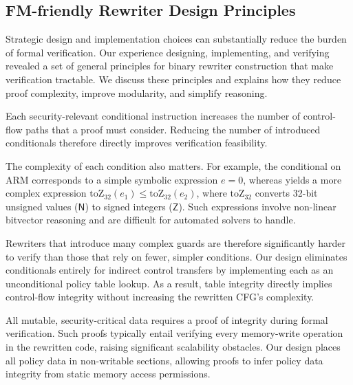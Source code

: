 \subsection{FM-friendly Rewriter Design Principles}\label{sec:fm_friendly}

Strategic design and implementation choices can substantially reduce the burden of formal verification. Our experience designing, implementing, and verifying \pname revealed a set of general principles for binary rewriter construction that make verification tractable. We discuss these principles and explains how they reduce proof complexity, improve modularity, and simplify reasoning.


Each security-relevant conditional instruction increases the number of control-flow paths that a proof must consider. Reducing the number of introduced conditionals therefore directly improves verification feasibility.

The complexity of each condition also matters. For example, the  conditional on ARM corresponds to a simple symbolic expression $e = 0$, whereas  yields a more complex expression $\mathrm{toZ}_{32}(e_1) \leq \mathrm{toZ}_{32}(e_2)$, where $\mathrm{toZ}_{32}$ converts 32-bit unsigned values ($\mathsf{N}$) to signed integers ($\mathsf{Z}$). Such expressions involve non-linear bitvector reasoning and are difficult for automated solvers to handle.

Rewriters that introduce many complex guards are therefore significantly harder to verify than those that rely on fewer, simpler conditions. Our design eliminates conditionals entirely for indirect control transfers by implementing each as an unconditional policy table lookup. As a result, table integrity directly implies control-flow integrity without increasing the rewritten CFG's complexity.

All mutable, security-critical data requires a proof of integrity during formal verification.
Such proofs typically entail verifying every memory-write operation in the rewritten code, raising significant scalability obstacles.
Our design places all policy data in non-writable sections, allowing proofs to infer policy data integrity from static memory access permissions.

